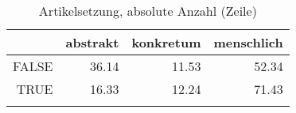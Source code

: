 \begin{table}[ht]
\centering
\begin{tabular}{rrrr}
  \lsptoprule
 & abstrakt & konkretum & menschlich \\ 
  \midrule
FALSE & 36.14 & 11.53 & 52.34 \\ 
  TRUE & 16.33 & 12.24 & 71.43 \\ 
   \lspbottomrule
\end{tabular}
\caption{Artikelsetzung, absolute Anzahl (Zeile)} 
\end{table}
